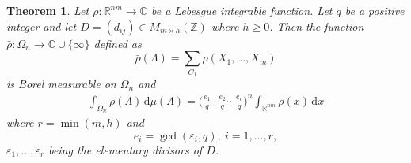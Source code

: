 \documentclass[11pt]{article}
\newtheorem{theorem}{Theorem}[section]
\theoremstyle{definition}
\theoremstyle{proof}
\begin{document}
\begin{theorem}\label{thmii}
    Let $\rho : \mathbb{R}^{nm} \to \mathbb{C}$ be a Lebesgue integrable function.
    Let $q$ be a positive integer and let $D = (d_{ij}) \in M_{m \times h}(\mathbb{Z})$ where $h \geq 0$.
    Then the function $\bar{\rho } : {\Omega}_n \to \mathbb{C} \cup \{\infty\}$ defined as
    \begin{equation}\label{lebrhobar}
        \bar{\rho} (\Lambda )  = \sum_{C_1} \rho (X_1, \ldots, X_m)
    \end{equation}
    is Borel measurable on ${\Omega}_n$ and
    \begin{align}\label{halfrogers}
        \int_{{\Omega}_n} \bar{\rho } (\Lambda ) \, \mathrm{d} \mu (\Lambda ) = {\bigg(\frac{e_1}{q} \cdot \frac{e_2}{q} \cdots \frac{e_r}{q} \bigg)}^n \int_{\mathbb{R}^{nm}} \rho (x) \, \mathrm{d} x
    \end{align}
    where $r = \min (m, h)$ and
    \[
        e_i = \gcd (\varepsilon _i, q), \ i = 1, \ldots, r,
    \]
    $\varepsilon _1, \ldots, \varepsilon _r$ being the elementary divisors of $D$.
\end{theorem}
\end{document}
